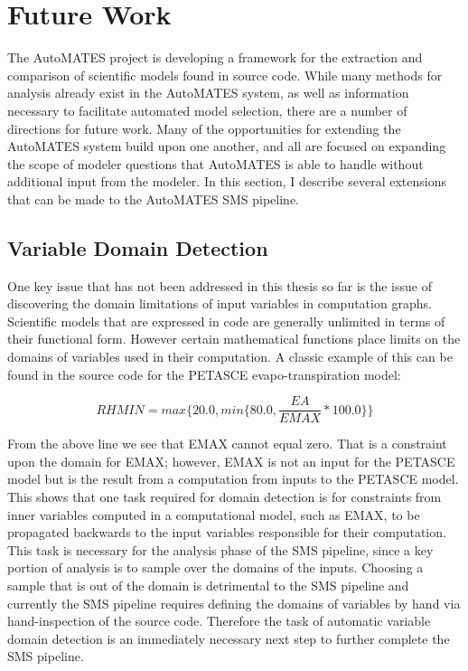 \section{Future Work\label{sec:future_work}}
The AutoMATES project is developing a framework for the extraction and comparison of scientific models found in source code.
While many methods for analysis already exist in the AutoMATES system, as well as information necessary to facilitate automated model selection, there are a number of directions for future work.
Many of the opportunities for extending the AutoMATES system build upon one another, and all are focused on expanding the scope of modeler questions that AutoMATES is able to handle without additional input from the modeler.
In this section, I describe several extensions that can be made to the AutoMATES SMS pipeline.

\subsection{Variable Domain Detection\label{sec:var_domain_detection}}
One key issue that has not been addressed in this thesis so far is the issue of discovering the domain limitations of input variables in computation graphs.
Scientific models that are expressed in code are generally unlimited in terms of their functional form.
However certain mathematical functions place limits on the domains of variables used in their computation.
A classic example of this can be found in the source code for the PETASCE evapo-transpiration model:

\begin{equation}
  RHMIN = max\{20.0, min\{80.0, \frac{EA}{EMAX}*100.0\}\}
\end{equation}

From the above line we see that EMAX cannot equal zero.
That is a constraint upon the domain for EMAX; however, EMAX is not an input for the PETASCE model but is the result from a computation from inputs to the PETASCE model.
This shows that one task required for domain detection is for constraints from inner variables computed in a computational model, such as EMAX, to be propagated backwards to the input variables responsible for their computation.
This task is necessary for the analysis phase of the SMS pipeline, since a key portion of analysis is to sample over the domains of the inputs.
Choosing a sample that is out of the domain is detrimental to the SMS pipeline and currently the SMS pipeline requires defining the domains of variables by hand via hand-inspection of the source code.
Therefore the task of automatic variable domain detection is an immediately necessary next step to further complete the SMS pipeline.

